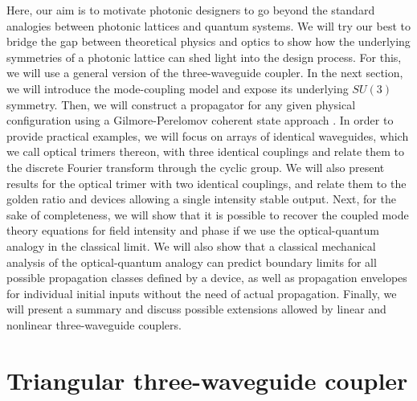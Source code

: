 \documentclass[9pt,twocolumn,twoside]{osajnl}
\begin{document}
Here, our aim is to motivate photonic designers to go beyond the standard analogies between photonic lattices and quantum systems. 
We will try our best to bridge the gap between theoretical physics and optics to show how the underlying symmetries of a photonic lattice can shed light into the design process. 
For this, we will use a general version of the three-waveguide coupler.
In the next section, we will introduce the mode-coupling model and expose its underlying $SU(3)$ symmetry. 
Then, we will construct a propagator for any given physical configuration using a Gilmore-Perelomov coherent state approach \cite{VillanuevaVergara2015p}.
In order to provide practical examples, we will focus on arrays of identical waveguides, which we call optical trimers thereon, with three identical couplings and relate them to the discrete Fourier transform through the cyclic group.
We will also present results for the optical trimer with two identical couplings, and relate them to the golden ratio and devices allowing a single intensity stable output. 
Next, for the sake of completeness, we will show that it is possible to recover the coupled mode theory equations for field intensity and phase if we use the optical-quantum analogy in the classical limit.
We will also show that a classical mechanical analysis of the optical-quantum analogy can predict boundary limits for all possible propagation classes defined by a device, as well as propagation envelopes for individual initial inputs without the need of actual propagation.
Finally, we will present a summary and discuss possible extensions allowed by linear and nonlinear three-waveguide couplers.


\section{Triangular three-waveguide coupler}
\end{document}
